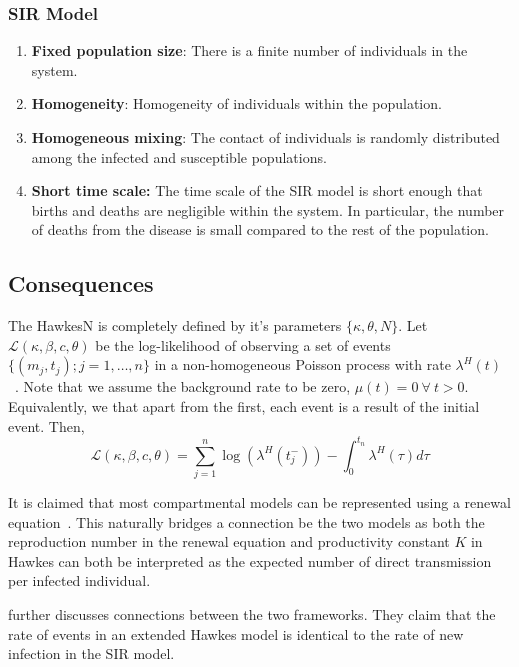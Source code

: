 \documentclass[12pt]{article}
\begin{document}
\subsubsection{SIR Model}
\begin{enumerate}
\item {\bf Fixed population size}: There is a finite number of individuals in the system.
\item {\bf Homogeneity}: Homogeneity of individuals within the population.
\item {\bf Homogeneous mixing}: The contact of individuals is randomly distributed among the infected and susceptible populations.  
\item {\bf Short time scale:} The time scale of the SIR model is short enough that births and deaths are negligible within the system. In particular, the number of deaths from the disease is small compared to the rest of the population. 
\end{enumerate}

\subsection{Consequences}


The HawkesN is completely defined by it's parameters $\{\kappa, \theta, N \}$. Let $\mathcal{L}(\kappa, \beta, c, \theta)$ be the log-likelihood of observing a set of events $\{(m_j, t_j); j = 1, \ldots, n\}$ in a non-homogeneous Poisson process with rate $\lambda^H(t)$~\cite{Rizoiu2018}. Note that we assume the background rate to be zero, $\mu(t) = 0 \ \forall\ t>0$. Equivalently, we that apart from the first, each event is a result of the initial event. Then,
\[
\mathcal{L}(\kappa, \beta, c, \theta) = \sum_{j=1}^n \log (\lambda^H (t_j^-)) - \int_0^{t_n} \lambda^H (\tau) d \tau
\]


It is claimed that most compartmental models can be represented using a renewal equation~\cite{Kresin2022}. This naturally bridges a connection be the two models as both the reproduction number in the renewal equation and productivity constant $K$ in Hawkes can both be interpreted as the expected number of direct transmission per infected individual.


\cite{Rizoiu2018} further discusses connections between the two frameworks. They claim that the rate of events in an extended Hawkes model is identical to the rate of new infection in the SIR model. 
\\
\end{document}
